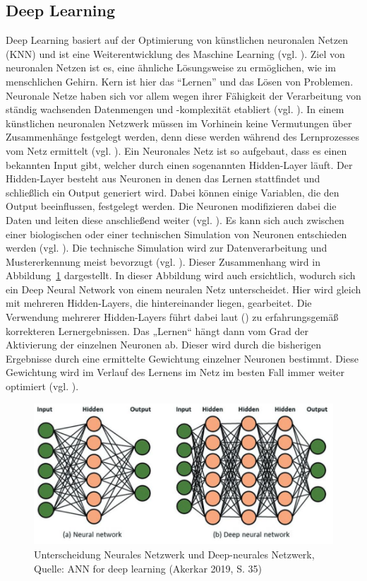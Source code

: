 \subsection{Deep Learning}
Deep Learning basiert auf der Optimierung von künstlichen neuronalen Netzen (KNN) und ist eine Weiterentwicklung des Maschine Learning (vgl. \cite[S. 1]{Georgevici.2019}). Ziel von neuronalen Netzen ist es, eine ähnliche Lösungsweise zu ermöglichen, wie im menschlichen Gehirn. Kern ist hier das “Lernen” und das Lösen von Problemen. Neuronale Netze haben sich vor allem wegen ihrer Fähigkeit der Verarbeitung von ständig wachsenden Datenmengen und -komplexität etabliert (vgl. \cite[S. 373]{Welsch.2018}). In einem künstlichen neuronalen Netzwerk müssen im Vorhinein keine Vermutungen über Zusammenhänge festgelegt werden, denn diese werden während des Lernprozesses vom Netz ermittelt (vgl. \cite[S. 581]{Backhaus.2018b}). Ein Neuronales Netz ist 
so aufgebaut, dass es einen bekannten Input gibt, welcher durch einen sogenannten Hidden-Layer läuft. Der Hidden-Layer besteht aus Neuronen in denen das Lernen stattfindet und schließlich ein Output generiert wird. Dabei können einige Variablen, die den Output beeinflussen, festgelegt werden. 
Die Neuronen modifizieren dabei die Daten und leiten diese anschließend weiter (vgl. \cite[S. 373]{Welsch.2018}). Es kann sich auch zwischen einer biologischen oder einer technischen Simulation von Neuronen entschieden werden (vgl. \cite{https:www.facebook.comspektrumverlag.04.12.2014}). Die technische Simulation wird zur Datenverarbeitung und Mustererkennung meist bevorzugt (vgl. \cite{https:www.facebook.comspektrumverlag.04.12.2014}). Dieser Zusammenhang wird in Abbildung~\ref{fig:NeuralVsDeepNeural} dargestellt. 
In dieser Abbildung wird auch ersichtlich, wodurch sich ein Deep Neural Network von einem neuralen Netz unterscheidet. Hier wird gleich mit mehreren Hidden-Layers, die hintereinander liegen, gearbeitet. Die Verwendung mehrerer Hidden-Layers führt dabei laut (\cite[S. 581]{Backhaus.2018b}) zu erfahrungsgemäß korrekteren Lernergebnissen. Das „Lernen“ hängt dann vom Grad der Aktivierung der einzelnen Neuronen ab. Dieser wird durch die bisherigen Ergebnisse durch eine ermittelte Gewichtung einzelner Neuronen bestimmt. Diese Gewichtung wird im Verlauf des Lernens im Netz im besten Fall immer weiter optimiert (vgl. \cite[S. 586]{Backhaus.2018b}).
\begin{figure}[ht]
\centering
\includegraphics[width=\linewidth]{pics/ANN_for_deep_learning_P35}
\caption{Unterscheidung Neurales Netzwerk und Deep-neurales Netzwerk, Quelle: ANN for deep learning (Akerkar 2019, S. 35)}
\label{fig:NeuralVsDeepNeural}
\end{figure}
